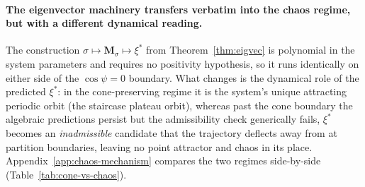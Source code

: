\documentclass[12pt]{article}
\newcommand{\vv}[1]{\mathbf{#1}}
\begin{document}
\paragraph{The eigenvector machinery transfers verbatim into the chaos regime, but with a different dynamical reading.}
The construction $\sigma\mapsto\vv{M}_\sigma\mapsto\xi^*$ from Theorem~\ref{thm:eigvec} is polynomial in the system parameters and requires no positivity hypothesis, so it runs identically on either side of the $\cos\psi=0$ boundary. What changes is the dynamical role of the predicted $\xi^*$: in the cone-preserving regime it is the system's unique attracting periodic orbit (the staircase plateau orbit), whereas past the cone boundary the algebraic predictions persist but the admissibility check generically fails, $\xi^*$ becomes an \emph{inadmissible} candidate that the trajectory deflects away from at partition boundaries, leaving no point attractor and chaos in its place. Appendix~\ref{app:chaos-mechanism} compares the two regimes side-by-side (Table~\ref{tab:cone-vs-chaos}).
\end{document}

